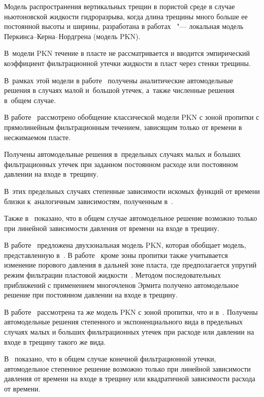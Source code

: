 Модель распространения вертикальных трещин в пористой среде в случае ньютоновской жидкости гидроразрыва, когда длина трещины много больше ее постоянной высоты и ширины, разработана в работах~\cite{Perkins_Kern, Nordgren1} "--- локальная модель Перкинса–Керна–Нордгрена (модель PKN). 

В~модели PKN течение в пласте не рассматривается и вводится эмпирический коэффициент фильтрационной утечки жидкости в пласт через стенки трещины. 

В~рамках этой модели в работе~\cite{Nordgren1} получены аналитические автомодельные решения в случаях малой и~большой утечек, а~также численные решения в~общем случае.



В работе~\cite{Iv_Sm1} рассмотрено обобщение классической модели PKN с зоной пропитки с прямолинейным фильтрационным течением, зависящим только от времени в несжимаемом пласте. 

Получены автомодельные решения в~предельных случаях малых и больших фильтрационных утечек при заданном постоянном расходе или постоянном давлении на входе в~трещину. 

В~этих предельных случаях степенные зависимости искомых функций от времени близки к~аналогичным зависимостям, полученным в~\cite{Nordgren1}. 

Также в~\cite{Iv_Sm1} показано, что в общем случае автомодельное решение возможно только при линейной зависимости давления от времени на входе в трещину.



В работе~\cite{Gord_Z1} предложена двухзональная модель PKN, которая обобщает модель, представленную в~\cite{Iv_Sm1}. В работе~\cite{Gord_Z1} кроме зоны пропитки также учитывается изменение порового давления в дальней зоне пласта, где предполагается упругий режим фильтрации пластовой жидкости~\cite{Basn1}. Методом последовательных приближений с применением многочленов Эрмита получено автомодельное решение при постоянном давлении на входе в трещину.



В работе~\cite{Smirn_Tag1} рассмотрена та же модель PKN с зоной пропитки, что и в~\cite{Iv_Sm1}. Получены автомодельные решения степенного и экспоненциального вида в предельных случаях малых и больших фильтрационных утечек при расходе или давлении на входе в трещину такого же вида. 

В~\cite{Smirn_Tag1} показано, что в общем случае конечной фильтрационной утечки, автомодельное степенное решение возможно только при линейной зависимости давления от времени на входе в трещину или квадратичной зависимости расхода от времени.



